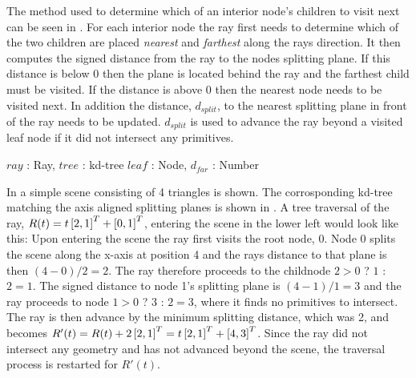 
The method used to determine which of an interior node's children to visit next
can be seen in . For each interior node the ray
first needs to determine which of the two children are placed \textit{nearest}
and \textit{farthest} along the rays direction. It then computes the signed
distance from the ray to the nodes splitting plane. If this distance is below 0
then the plane is located behind the ray and the farthest child must be
visited. If the distance is above 0 then the nearest node needs to be visited
next. In addition the distance, $d_{split}$, to the nearest splitting plane in
front of the ray needs to be updated. $d_{split}$ is used to advance the ray
beyond a visited leaf node if it did not intersect any primitives.

\begin{algorithm}
  \caption{A basic kd-tree traversal algorithm}
  \label{alg:generalTraversal}
  \begin{algorithmic}
              {$ray$ : Ray, $tree$ : kd-tree}
              {$leaf$ : Node, $d_{far}$ : Number}{
                  \ELSE
                  \ENDIF
                \ENDWHILE
              }
  \end{algorithmic}
\end{algorithm}

In  a simple scene consisting of 4 triangles
is shown. The corrosponding kd-tree matching the axis aligned
splitting planes is shown in . A tree traversal
of the ray, $R(t) = t \left[2, 1 \right]^T + \left[0, 1 \right]^T$, entering the
scene in the lower left would look like this: Upon entering the scene
the ray first visits the root node, 0. Node 0 splits the scene along
the x-axis at position 4 and the rays distance to that plane is then
$(4 - 0) / 2 = 2$. The ray therefore proceeds to the childnode $2 > 0$ 
? $1$ : $2 = 1$. The signed distance to node 1's splitting plane is $(4 -
1) / 1 = 3$ and the ray proceeds to node $1 > 0$ ? $3$ : $2 = 3$, where it
finds no primitives to intersect. The ray is then advance by the
minimum splitting distance, which was 2, and becomes $R'(t) = R(t) + 2
\left[2, 1 \right]^T = t \left[2, 1 \right]^T + \left[4, 3 \right]^T$. Since the ray did
not intersect any geometry and has not advanced beyond the scene, the
traversal process is restarted for $R'(t)$.


